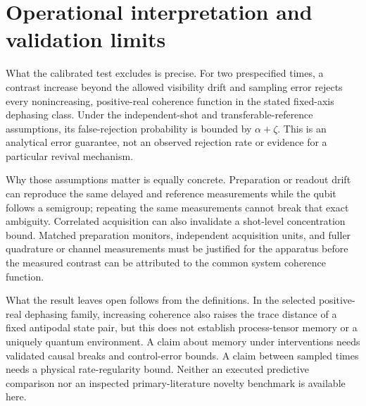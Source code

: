 \documentclass[11pt]{article}
\begin{document}
\section{Operational interpretation and validation limits}
What the calibrated test excludes is precise. For two prespecified times, a contrast increase beyond the allowed visibility drift and sampling error rejects every nonincreasing, positive-real coherence function in the stated fixed-axis dephasing class. Under the independent-shot and transferable-reference assumptions, its false-rejection probability is bounded by $\alpha+\zeta$. This is an analytical error guarantee, not an observed rejection rate or evidence for a particular revival mechanism.

Why those assumptions matter is equally concrete. Preparation or readout drift can reproduce the same delayed and reference measurements while the qubit follows a semigroup; repeating the same measurements cannot break that exact ambiguity. Correlated acquisition can also invalidate a shot-level concentration bound. Matched preparation monitors, independent acquisition units, and fuller quadrature or channel measurements must be justified for the apparatus before the measured contrast can be attributed to the common system coherence function.

What the result leaves open follows from the definitions. In the selected positive-real dephasing family, increasing coherence also raises the trace distance of a fixed antipodal state pair, but this does not establish process-tensor memory or a uniquely quantum environment. A claim about memory under interventions needs validated causal breaks and control-error bounds. A claim between sampled times needs a physical rate-regularity bound. Neither an executed predictive comparison nor an inspected primary-literature novelty benchmark is available here.
\end{document}
